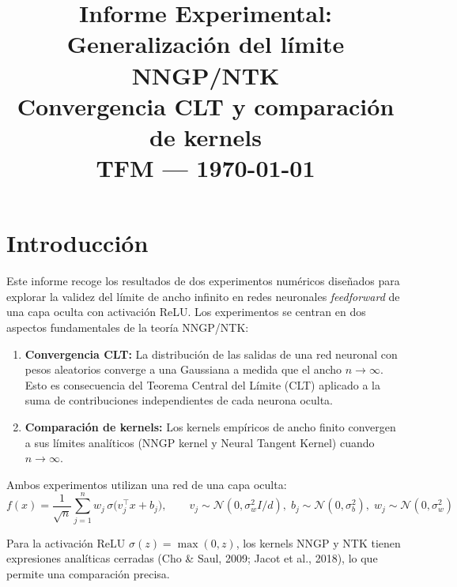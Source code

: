 \documentclass[11pt,a4paper]{article}
\begin{document}
\title{\vspace{-1.5cm}
       \textbf{Informe Experimental: Generalización del límite NNGP/NTK}\\[0.4cm]
       {\large Convergencia CLT y comparación de kernels}\\[0.2cm]
       {\small TFM --- \today}
       }
\date{}
\maketitle
\thispagestyle{fancy}

\section{Introducción}

Este informe recoge los resultados de dos experimentos numéricos diseñados para explorar la validez del límite de ancho infinito en redes neuronales \emph{feedforward} de una capa oculta con activación ReLU. Los experimentos se centran en dos aspectos fundamentales de la teoría NNGP/NTK:

\begin{enumerate}
  \item \textbf{Convergencia CLT:} La distribución de las salidas de una red neuronal con pesos aleatorios converge a una Gaussiana a medida que el ancho $n \to \infty$. Esto es consecuencia del Teorema Central del Límite (CLT) aplicado a la suma de contribuciones independientes de cada neurona oculta.
  \item \textbf{Comparación de kernels:} Los kernels empíricos de ancho finito convergen a sus límites analíticos (NNGP kernel y Neural Tangent Kernel) cuando $n \to \infty$.
\end{enumerate}

Ambos experimentos utilizan una red de una capa oculta:
\begin{equation}
f(x) = \frac{1}{\sqrt{n}} \sum_{j=1}^{n} w_j\, \sigma\bigl(v_j^\top x + b_j\bigr),
\qquad 
v_j \sim \mathcal{N}(0, \sigma_w^2 I / d),\; b_j \sim \mathcal{N}(0, \sigma_b^2),\; w_j \sim \mathcal{N}(0, \sigma_w^2)
\end{equation}

Para la activación ReLU $\sigma(z) = \max(0, z)$, los kernels NNGP y NTK tienen expresiones analíticas cerradas (Cho \& Saul, 2009; Jacot et al., 2018), lo que permite una comparación precisa.
\end{document}
